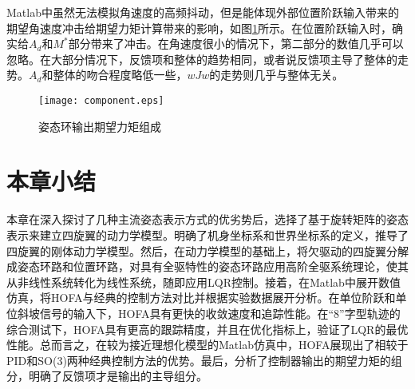 Matlab中虽然无法模拟角速度的高频抖动，但是能体现外部位置阶跃输入带来的期望角速度冲击给期望力矩计算带来的影响，如图\ref{fig:com}所示。在位置阶跃输入时，确实给$A_d$和$M^*$部分带来了冲击。在角速度很小的情况下，第二部分的数值几乎可以忽略。在大部分情况下，反馈项和整体的趋势相同，或者说反馈项主导了整体的走势。$A_d$和整体的吻合程度略低一些，$wJw$的走势则几乎与整体无关。
\begin{figure}[!h]
  \centering
  \texttt{[image: component.eps]}
  \caption{姿态环输出期望力矩组成}
  \label{fig:com}
\end{figure}
\newpage
\section{本章小结}
本章在深入探讨了几种主流姿态表示方式的优劣势后，选择了基于旋转矩阵的姿态表示来建立四旋翼的动力学模型。明确了机身坐标系和世界坐标系的定义，推导了四旋翼的刚体动力学模型。然后，在动力学模型的基础上，将欠驱动的四旋翼分解成姿态环路和位置环路，对具有全驱特性的姿态环路应用高阶全驱系统理论，使其从非线性系统转化为线性系统，随即应用LQR控制。接着，在Matlab中展开数值仿真，将HOFA与经典的控制方法对比并根据实验数据展开分析。在单位阶跃和单位斜坡信号的输入下，HOFA具有更快的收敛速度和追踪性能。在“8”字型轨迹的综合测试下，HOFA具有更高的跟踪精度，并且在优化指标上，验证了LQR的最优性能。总而言之，在较为接近理想化模型的Matlab仿真中，HOFA展现出了相较于PID和SO(3)两种经典控制方法的优势。最后，分析了控制器输出的期望力矩的组分，明确了反馈项才是输出的主导组分。